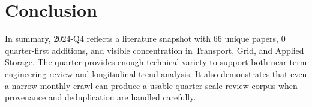 \documentclass[conference]{IEEEtran}
\begin{document}
\section{Conclusion}
In summary, 2024-Q4 reflects a literature snapshot with 66 unique papers, 0 quarter-first additions, and visible concentration in Transport, Grid, and Applied Storage. The quarter provides enough technical variety to support both near-term engineering review and longitudinal trend analysis. It also demonstrates that even a narrow monthly crawl can produce a usable quarter-scale review corpus when provenance and deduplication are handled carefully.



\end{document}
